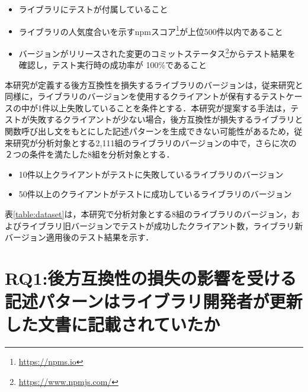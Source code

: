 \documentclass[11pt]{jreport}
\newcommand{\RQOne}{後方互換性の損失の影響を受ける記述パターンはライブラリ開発者が更新した文書に記載されていたか}
\begin{document}
\begin{itemize}
\item ライブラリにテストが付属していること
\item ライブラリの人気度合いを示すnpmスコア\footnote{\url{https://npms.io}}が上位500件以内であること
\item バージョンがリリースされた変更のコミットステータス\footnote{\url{https://www.npmjs.com/}}からテスト結果を確認し，テスト実行時の成功率が 100\%であること
\end{itemize}

本研究が定義する後方互換性を損失するライブラリのバージョンは，従来研究\cite{mujahid}と同様に，ライブラリのバージョンを使用するクライアントが保有するテストケースの中が1件以上失敗していることを条件とする．本研究が提案する手法は，テストが失敗するクライアントが少ない場合，後方互換性が損失するライブラリと関数呼び出し文をもとにした記述パターンを生成できない可能性があるため，従来研究\cite{matsuda}が分析対象とする2,111組のライブラリのバージョンの中で，さらに次の２つの条件を満たした8組を分析対象とする．
\begin{itemize}
\item 10件以上クライアントがテストに失敗しているライブラリのバージョン
\item 50件以上のクライアントがテストに成功しているライブラリのバージョン
\end{itemize}
表\ref{table:dataset}は，本研究で分析対象とする8組のライブラリのバージョン，およびライブラリ旧バージョンでテストが成功したクライアント数，ライブラリ新バージョン適用後のテスト結果を示す．

\section{RQ1:\RQOne}\label{sec:RQ1}

\end{document}
